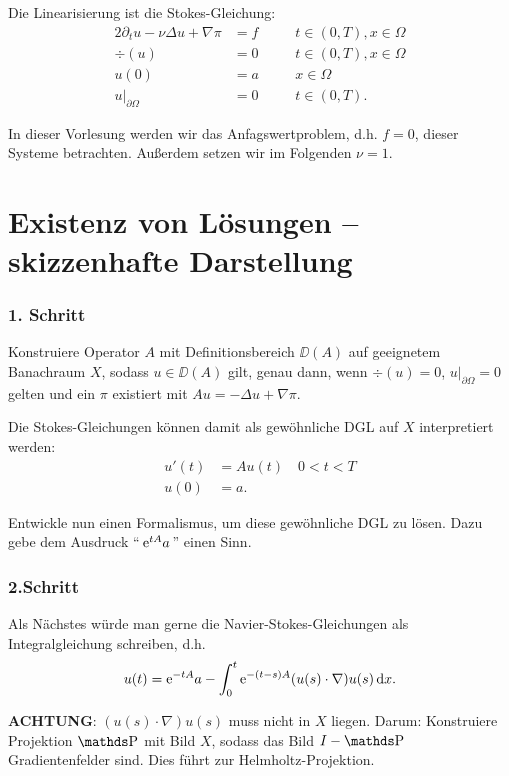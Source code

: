 Die Linearisierung ist die Stokes-Gleichung:
\begin{alignat*}{2}
  \partial_t u - \nu \Delta u + \nabla \pi &= f \quad&& t \in (0,T), x \in \Omega \\
  \div(u) &= 0 \quad&&t \in (0,T), x \in \Omega \\
  u(0) &= a \quad&& x \in \Omega \\
  u|_{\partial\Omega} &= 0 \quad&& t \in (0,T).
\end{alignat*}

In dieser Vorlesung werden wir das Anfagswertproblem, d.h. $f = 0$, dieser Systeme betrachten. 
Außerdem setzen wir im Folgenden $\nu = 1$.

\section{Existenz von Lösungen -- skizzenhafte Darstellung}

\subsubsection*{1. Schritt}

Konstruiere Operator $A$ mit Definitionsbereich $\DD(A)$ auf geeignetem Banachraum $X$, sodass $u \in \DD(A)$ gilt, genau dann, wenn $\div(u) = 0$, $u|_{\partial \Omega} = 0$ gelten und ein $\pi$ existiert mit $Au = -\Delta u + \nabla \pi$.

Die Stokes-Gleichungen können damit als gewöhnliche DGL auf $X$ interpretiert werden:
\begin{align*}
  u'(t) &= Au(t) \quad 0 < t < T\\
  u(0) &= a.
\end{align*}

Entwickle nun einen Formalismus, um diese gewöhnliche DGL zu lösen. Dazu gebe dem Ausdruck ``$\, \mathrm{e}^{tA} a \, $'' einen Sinn.

\subsubsection*{2.Schritt}

Als Nächstes würde man gerne die Navier-Stokes-Gleichungen als Integralgleichung schreiben, d.h.
$$
 u(t) = \mathrm{e}^{-tA} a - \int_0^t \mathrm{e}^{-(t - s)A} (u(s) \cdot \nabla) u(s) \, {\operatorname{d}\!{x}}.
$$

\textbf{ACHTUNG}: $(u(s) \cdot \nabla) u(s)$ muss nicht in $X$ liegen. Darum: Konstruiere Projektion $\PP$ mit Bild $X$, sodass das Bild $I - \PP$ Gradientenfelder sind. Dies führt zur Helmholtz-Projektion.

